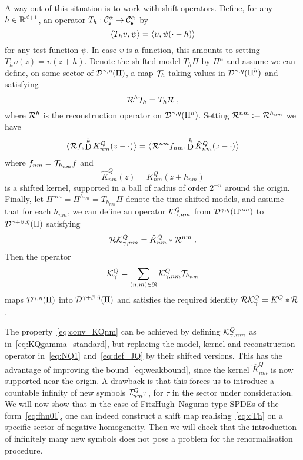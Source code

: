 \documentclass[reqno,11pt]{article}
\def\KQhat{\hat K^Q}
\def\fraks{\mathfrak{s}}
\DeclareMathOperator{\D}{D}            %
\newcommand{\setnm}{\mathfrak{N}}
\newcommand{\sumnm}{\sum_{(n,m)\in\setnm}}
\begin{document}
A way out of this situation is to work with shift operators. 
Define, for any $h\in\mathbb{R}^{d+1}$, an operator $T_h:
\cC^\alpha_\fraks \to \cC^\alpha_\fraks$ by 
\begin{equation}
 \langle T_h\upsilon,\psi\rangle = \langle\upsilon,\psi(\cdot-h)\rangle
\end{equation} 
for any test function $\psi$. In case $\upsilon$ is a function, this amounts to
setting $T_h\upsilon(z) = \upsilon(z+h)$. Denote the shifted model $T_h\Pi$ by
$\Pi^h$ and assume we can define, on some sector of ${\mathcal D}^{\gamma,\eta}(\Pi)$, a
map ${\mathcal T}_h$ taking values in ${\mathcal D}^{\gamma,\eta}(\Pi^h)$ and satisfying
\begin{equation}
 \label{eq:cTh}
 \cR^h\cT_h = T_h\cR\;,
\end{equation} 
where ${\mathcal R}^h$ is the reconstruction operator on ${\mathcal D}^{\gamma,\eta}(\Pi^h)$. 
Setting ${\mathcal R}^{nm} := {\mathcal R}^{h_{nm}}$ we have 
\begin{equation}
 \bigpscal{\cR f}{\D^k K^Q_{nm}(z-\cdot)} 
 = \bigpscal{\cR^{nm} f_{nm}}{\D^k \KQhat_{nm}(z-\cdot)}
\end{equation} 
where $f_{nm} = {\mathcal T}_{h_{nm}}f$ and 
\begin{equation}
\label{eq:KQhat} 
 \KQhat_{nm}(z) = K^Q_{nm}(z + h_{nm})
\end{equation} 
is a shifted kernel, supported in a ball of radius of order $2^{-n}$ around the
origin. Finally, let $\Pi^{nm} = \Pi^{h_{nm}} = T_{h_{nm}}\Pi$ denote the 
time-shifted models, and assume that for each $h_{nm}$, we can define an 
operator ${\mathcal K}^Q_{\gamma,nm}$ from ${\mathcal D}^{\gamma,\eta}(\Pi^{nm})$ to
${\mathcal D}^{\gamma+\beta,\bar\eta}(\Pi)$ satisfying 
\begin{equation}
\label{eq:conv_KQnm} 
 \cR\cK^Q_{\gamma,nm} = \KQhat_{nm} * \cR^{nm}\;.
\end{equation} 
Then the operator 
\begin{equation}
 \cK^Q_{\gamma} = \sumnm \cK^Q_{\gamma,nm}\cT_{h_{nm}} 
\end{equation} 
maps ${\mathcal D}^{\gamma,\eta}(\Pi)$ into ${\mathcal D}^{\gamma+\beta,\bar\eta}(\Pi)$
and satisfies the required identity ${\mathcal R}{\mathcal K}^Q_\gamma = K^Q*{\mathcal R}$. 

The property~\eqref{eq:conv_KQnm} can be achieved by defining
${\mathcal K}^Q_{\gamma,nm}$ as in~\eqref{eq:KQgamma_standard}, but replacing the model,
kernel and reconstruction operator in~\eqref{eq:NQ1} and~\eqref{eq:def_JQ} by
their shifted versions. This has the advantage of improving the
bound~\eqref{eq:weakbound}, since the kernel $\KQhat_{nm}$ is now supported near
the origin. A drawback is that this forces us to introduce a countable infinity
of new symbols ${\mathcal I}^Q_{nm}\tau$, for $\tau$ in the sector under consideration.
We will now show that in the case of FitzHugh--Nagumo-type SPDEs of the
form~\eqref{eq:fhn01}, one can indeed construct a shift map
realising~\eqref{eq:cTh} on a specific sector of negative homogeneity. Then we
will check that the introduction of infinitely many new symbols does not pose a
problem for the renormalisation procedure. 
\end{document}
